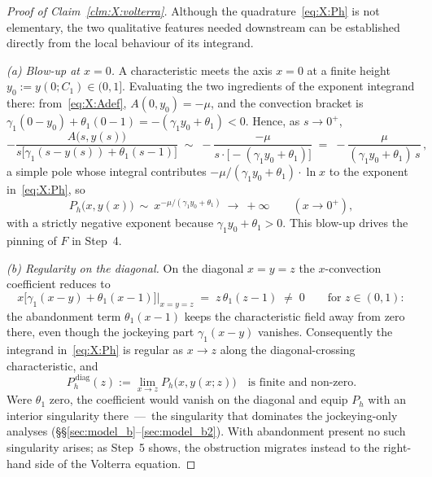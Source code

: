\begin{proof}[Proof of Claim~\ref{clm:X:volterra}]
Although the quadrature~\eqref{eq:X:Ph} is not elementary, the two qualitative features
needed downstream can be established directly from the local behaviour of its
integrand.

\smallskip\noindent\textit{(a) Blow-up at $x=0$.}
A characteristic meets the axis $x=0$ at a finite height $y_0:=y(0;C_1)\in(0,1]$.
Evaluating the two ingredients of the exponent integrand there: from~\eqref{eq:X:Adef},
$A(0,y_0)=-\mu$, and the convection bracket is
$\gamma_1(0-y_0)+\theta_1(0-1)=-(\gamma_1 y_0+\theta_1)<0$. Hence, as $s\to0^+$,
\begin{equation}
    -\frac{A\bigl(s,y(s)\bigr)}{s\bigl[\gamma_1(s-y(s))+\theta_1(s-1)\bigr]}
    \;\sim\;
    -\frac{-\mu}{s\cdot\bigl[-(\gamma_1 y_0+\theta_1)\bigr]}
    \;=\;
    -\frac{\mu}{(\gamma_1 y_0+\theta_1)\,s}\,,
    \nonumber
\end{equation}
a simple pole whose integral contributes $-\mu/(\gamma_1 y_0+\theta_1)\cdot\ln x$ to
the exponent in~\eqref{eq:X:Ph}, so
\begin{equation}
    P_h\bigl(x,y(x)\bigr)\ \sim\ x^{-\mu/(\gamma_1 y_0+\theta_1)}\ \longrightarrow\ +\infty
    \qquad (x\to0^+),
    \label{eq:X:Ph_at_zero}
\end{equation}
with a strictly negative exponent because $\gamma_1 y_0+\theta_1>0$. This blow-up
drives the pinning of $F$ in Step~4.

\smallskip\noindent\textit{(b) Regularity on the diagonal.}
On the diagonal $x=y=z$ the $x$-convection coefficient reduces to
\begin{equation}
    x\bigl[\gamma_1(x-y)+\theta_1(x-1)\bigr]\Big|_{x=y=z}
    \;=\; z\,\theta_1(z-1)\;\neq\;0
    \qquad\text{for } z\in(0,1):
    \nonumber
\end{equation}
the abandonment term $\theta_1(x-1)$ keeps the characteristic field away from zero
there, even though the jockeying part $\gamma_1(x-y)$ vanishes. Consequently the
integrand in~\eqref{eq:X:Ph} is regular as $x\to z$ along the diagonal-crossing
characteristic, and
\begin{equation}
    P_h^{\,\mathrm{diag}}(z):=\lim_{x\to z}P_h\bigl(x,y(x;z)\bigr)
    \quad\text{is finite and non-zero.}
    \label{eq:X:Ph_diag}
\end{equation}
Were $\theta_1$ zero, the coefficient would vanish on the diagonal and equip $P_h$ with
an interior singularity there~---~the singularity that dominates the jockeying-only
analyses (\S\S\ref{sec:model_b}--\ref{sec:model_b2}). With abandonment present no such
singularity arises; as Step~5 shows, the obstruction migrates instead to the right-hand
side of the Volterra equation.


\end{proof}
